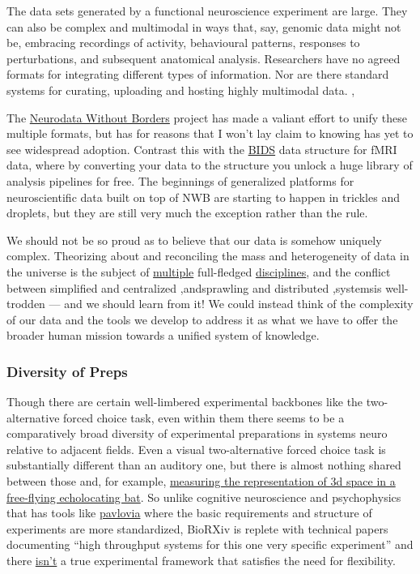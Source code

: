 \documentclass{article}
\begin{document}
\begin{leftbar}
The data sets generated by a functional neuroscience experiment are
large. They can also be complex and multimodal in ways that, say,
genomic data might not be, embracing recordings of activity, behavioural
patterns, responses to perturbations, and subsequent anatomical
analysis. Researchers have no agreed formats for integrating different
types of information. Nor are there standard systems for curating,
uploading and hosting highly multimodal data. \cite{mainenBetterWayCrack2016},\end{leftbar}
The \href{https://www.nwb.org/}{Neurodata Without Borders} project has
made a valiant effort to unify these multiple formats, but has for
reasons that I won't lay claim to knowing has yet to see widespread
adoption. Contrast this with the
\href{https://bids.neuroimaging.io/}{BIDS} data structure for fMRI data,
where by converting your data to the structure you unlock a huge library
of analysis pipelines for free. The beginnings of generalized platforms
for neuroscientific data built on top of NWB are starting to happen in
trickles and droplets, but they are still very much the exception rather
than the rule.

We should not be so proud as to believe that our data is somehow
uniquely complex. Theorizing about and reconciling the mass and
heterogeneity of data in the universe is the subject of
\href{https://en.wikipedia.org/wiki/Information_science}{multiple}
full-fledged
\href{https://en.wikipedia.org/wiki/Library_science}{disciplines}, and
the conflict between simplified and centralized \cite{bakerMaintainingDublinCore2005},andsprawling and distributed \cite{berners-leeSEMANTICWEB2001},systemsis well-trodden --- and we
should learn from it! We could instead think of the complexity of our
data and the tools we develop to address it as what we have to offer the
broader human mission towards a unified system of knowledge.

\hypertarget{diversity-of-preps}{%
\subsubsection{Diversity of Preps}\label{diversity-of-preps}}

Though there are certain well-limbered experimental backbones like the
two-alternative forced choice task, even within them there seems to be a
comparatively broad diversity of experimental preparations in systems
neuro relative to adjacent fields. Even a visual two-alternative forced
choice task is substantially different than an auditory one, but there
is almost nothing shared between those and, for example,
\href{https://doi.org/10.7554/eLife.29053}{measuring the representation
of 3d space in a free-flying echolocating bat}. So unlike cognitive
neuroscience and psychophysics that has tools like
\href{https://pavlovia.org/}{pavlovia} where the basic requirements and
structure of experiments are more standardized, BioRXiv is replete with
technical papers documenting ``high throughput systems for this one very
specific experiment'' and there
\href{https://docs.auto-pi-lot.com}{isn't} a true experimental framework
that satisfies the need for flexibility.
\end{document}
